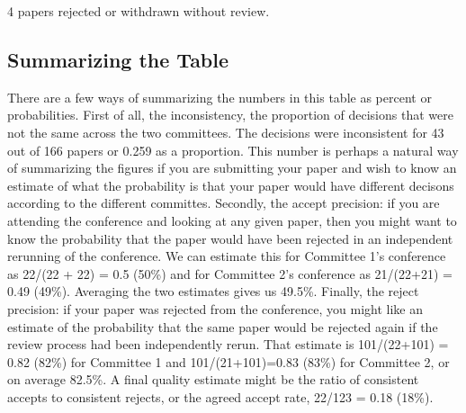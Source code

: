 \documentclass[a4paperpaper,]{article}
\begin{document}
4 papers rejected or withdrawn without review.

\hypertarget{summarizing-the-table}{%
\subsection{Summarizing the Table}\label{summarizing-the-table}}

There are a few ways of summarizing the numbers in this table as percent
or probabilities. First of all, the inconsistency, the proportion of
decisions that were not the same across the two committees. The
decisions were inconsistent for 43 out of 166 papers or 0.259 as a
proportion. This number is perhaps a natural way of summarizing the
figures if you are submitting your paper and wish to know an estimate of
what the probability is that your paper would have different decisons
according to the different committes. Secondly, the accept precision: if
you are attending the conference and looking at any given paper, then
you might want to know the probability that the paper would have been
rejected in an independent rerunning of the conference. We can estimate
this for Committee 1's conference as 22/(22 + 22) = 0.5 (50\%) and for
Committee 2's conference as 21/(22+21) = 0.49 (49\%). Averaging the two
estimates gives us 49.5\%. Finally, the reject precision: if your paper
was rejected from the conference, you might like an estimate of the
probability that the same paper would be rejected again if the review
process had been independently rerun. That estimate is 101/(22+101) =
0.82 (82\%) for Committee 1 and 101/(21+101)=0.83 (83\%) for Committee
2, or on average 82.5\%. A final quality estimate might be the ratio of
consistent accepts to consistent rejects, or the agreed accept rate,
22/123 = 0.18 (18\%).
\end{document}
